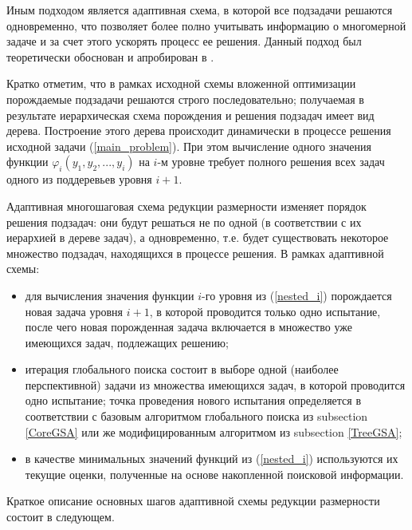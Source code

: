\documentclass[entropy,article,submit,moreauthors,pdftex]{Definitions/mdpi}
\begin{document}
Иным  подходом является адаптивная схема, в которой все подзадачи решаются одновременно, что позволяет более полно учитывать информацию о многомерной задаче и за счет этого ускорять процесс ее решения.
Данный подход был теоретически обоснован и апробирован в \cite{Grishagin2016,Grishagin2016_1,Grishagin2018}. 

Кратко отметим, что в рамках исходной схемы вложенной оптимизации порождаемые подзадачи решаются строго последовательно; получаемая в результате иерархическая схема порождения и решения подзадач имеет вид дерева. Построение этого дерева происходит динамически в процессе решения исходной задачи (\ref{main_problem}). При этом вычисление одного значения функции $\varphi_i(y_1,y_2,...,y_i)$ на $i$-м уровне требует полного решения всех задач одного из поддеревьев уровня $i+1$.

Адаптивная многошаговая схема редукции размерности изменяет порядок решения подзадач: они будут решаться не по одной (в соответствии с их иерархией в дереве задач), а одновременно, т.е. будет существовать некоторое множество подзадач, находящихся в процессе решения. В рамках адаптивной схемы:
\begin{itemize}
	\item 
для вычисления значения функции $i$-го уровня из (\ref{nested_i}) порождается новая задача уровня $i+1$, в которой проводится только одно испытание, после чего новая порожденная задача включается в множество уже имеющихся задач, подлежащих решению;
	\item 
	итерация глобального поиска состоит в выборе одной (наиболее перспективной) задачи из множества имеющихся задач, в которой проводится одно испытание; точка проведения нового испытания определяется в соответствии с базовым алгоритмом глобального поиска из subsection \ref{CoreGSA} или же модифицированным алгоритмом из subsection \ref{TreeGSA};
	\item
в качестве минимальных значений функций из (\ref{nested_i}) используются их текущие оценки, полученные на основе накопленной поисковой информации.
\end{itemize}

Краткое описание основных шагов адаптивной схемы редукции размерности состоит в следующем.
\end{document}
